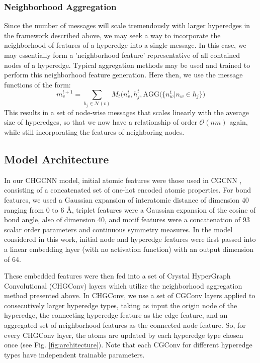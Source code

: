 \documentclass[twoside,twocolumn,9pt]{article}
\begin{document}

\subsubsection{Neighborhood Aggregation}
Since the number of messages will scale tremendously with larger hyperedges in the framework described above, we may seek a way to incorporate the neighborhood of features of a hyperedge into a single message. In this case, we may essentially form a 'neighborhood feature' representative of all contained nodes of a hyperedge. Typical aggregation methods may be used and trained to perform this neighborhood feature generation. Here then, we use the message functions of the form:
$$
m_v^{t+1}=\sum_{h_j\in \mathcal{N}(v)} M_t(n_v^{t},h_j^{t},\text{AGG}\big(\lbrace n_w^t \vert n_w \in h_j \rbrace\big)
$$
This results in a set of node-wise messages that scales linearly with the average size of hyperedges, so that we now have a relationship of order $\mathcal{O}(nm)$ again, while still incorporating the features of neighboring nodes.

\subsection{Model Architecture}
In our CHGCNN model, initial atomic features were those used in CGCNN \cite{cgcnn}, consisting of a concatenated set of one-hot encoded atomic properties. For bond features, we used a Gaussian expansion of interatomic distance of dimension 40 ranging from 0 to 6 \AA, triplet features were a Gaussian expansion of the cosine of bond angle, also of dimension 40, and motif features were a concatenation of 93 scalar order parameters and continuous symmetry measures. In the model considered in this work, initial node and hyperedge features were first passed into a linear embedding layer (with no activation function) with an output dimension of 64. 

These embedded features were then fed into a set of Crystal HyperGraph Convolutional (CHGConv) layers which utilize the neighborhood aggregation method presented above. In CHGConv, we use a set of CGConv \cite{cgcnn} layers applied to consecutively larger hyperedge types, taking as input the origin node of the hyperedge, the connecting hyperedge feature as the edge feature, and an aggregated set of neighborhood features as the connected node feature. So, for every CHGConv layer, the atoms are updated by each hyperedge type chosen once (see Fig. \ref{fig:architecture}). Note that each CGConv for different hyperedge types have independent trainable parameters. 
\end{document}
